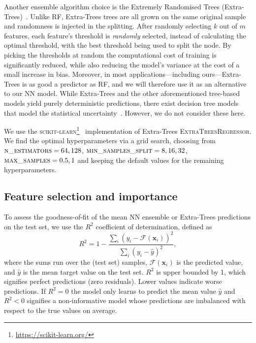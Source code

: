 \documentclass[usenatbib,useAMS]{mnras}
\begin{document}
Another ensemble algorithm choice is the Extremely Randomised Trees (Extra-Trees)~\citep{Geurts_2006_ExtraTrees}. Unlike RF, Extra-Trees trees are all grown on the same original sample and randomness is injected in the splitting. After randomly selecting $k$ out of $m$ features, each feature's threshold is \emph{randomly} selected, instead of calculating the optimal threshold, with the best threshold being used to split the node. By picking the thresholds at random the computational cost of training is significantly reduced, while also reducing the model's variance at the cost of a small increase in bias. Moreover, in most applications---including ours---Extra-Trees is as good a predictor as RF, and we will therefore use it as an alternative to our NN model. While Extra-Trees and the other aforementioned tree-based models yield purely deterministic predictions, there exist decision tree models that model the statistical uncertainty~\citep[e.g.][]{BART, NGBoost}. However, we do not consider these here.

We use the \textsc{scikit-learn}\footnote{\url{https://scikit-learn.org/}}~\citep{scikit-learn} implementation of Extra-Trees \textsc{ExtraTreesRegressor}. We find the optimal hyperparameters via a grid search, choosing from $\textsc{n\_estimators}=64, 128$, $\textsc{min\_samples\_split}=8, 16, 32$, $\textsc{max\_samples} = 0.5, 1$ and keeping the default values for the remaining hyperparameters.


\subsection{Feature selection and importance}
\label{sec:feature_selection}

To assess the goodness-of-fit of the mean NN ensemble or Extra-Trees predictions on the test set, we use the $R^2$ coefficient of determination, defined as
\begin{equation}
    R^2
    = 1 - \frac{\sum_{i} \left(y_i - \mathcal{F}(\bm{x}_i)\right)^2}{\sum_{i} \left(y_i - \hat{y}\right)^2},
\end{equation}
where the sums run over the (test set) samples, $\mathcal{F}(\bm{x}_i)$ is the predicted value,  and $\hat{y}$ is the mean target value on the test set. $R^2$ is upper bounded by 1, which signifies perfect predictions (zero residuals). Lower values indicate worse predictions. If $R^2 = 0$ the model only learns to predict the mean value $\hat{y}$ and $R^2 < 0$ signifies a non-informative model whose predictions are imbalanced with respect to the true values on average.
\end{document}
